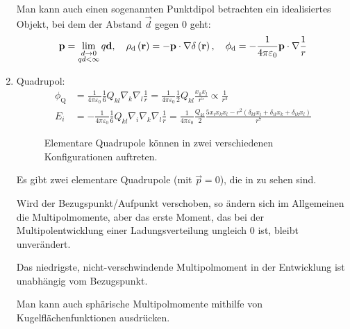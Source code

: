 \begin{enumerate}
	      Man kann auch einen sogenannten Punktdipol betrachten \textendash{} ein idealisiertes Objekt, bei dem der Abstand $\vec {d}$ gegen $0$ geht:
	      \begin{equation*}
		      \mathbf{p}=\lim _{\substack{
				      d\rightarrow 0 \\
				      qd<\infty}} q\mathbf{d},\quad \rho _{\mathop{}\!\mathrm{d} }\left(\mathbf{r}\right)=-\mathbf{p}\cdot \nabla \delta \left(\mathbf{r}\right), \quad\phi _{\mathop{}\!\mathrm{d} }=-\frac{1}{4\pi \varepsilon _{0}}\mathbf{p}\cdot \nabla \frac{1}{r}
	      \end{equation*}
	\item Quadrupol:
	      \begin{align*}
		      \phi _{\mathrm{Q}} & =\frac{1}{4\pi \varepsilon _{0}}\frac{1}{6}Q_{kl}\nabla _{k}\nabla _{l}\frac{1}{r}=\frac{1}{4\pi \varepsilon _{0}}\frac{1}{2}Q_{kl}\frac{x_{k}x_{l}}{r^{5}}\propto \frac{1}{r^{3}}                                                                   \\
		      E_{i}              & =-\frac{1}{4\pi \varepsilon _{0}}\frac{1}{6}Q_{kl}\nabla _{i}\nabla _{k}\nabla _{l}\frac{1}{r}=\frac{1}{4\pi \varepsilon _{0}}\frac{Q_{kl}}{2}\frac{5x_{i}x_{k}x_{l}-r^{2}\left(\delta _{kl}x_{i}+\delta _{il}x_{k}+\delta _{ik}x_{l}\right)}{r^{7}}
	      \end{align*}


	      \begin{figure}[htb]
		      \centering
		      \tfigElementalQuadrupoles
		      \caption{Elementare Quadrupole können in zwei verschiedenen Konfigurationen auftreten. }
		      \label{fig:elemental_quadrupoles}
	      \end{figure}

	      Es gibt zwei elementare Quadrupole (mit $\vec {p}=0$), die in  zu sehen sind.

	      Wird der Bezugspunkt/Aufpunkt verschoben, so ändern sich im Allgemeinen die Multipolmomente, aber das erste Moment, das bei der Multipolentwicklung einer Ladungsverteilung ungleich $0$ ist, bleibt unverändert.


	      \begin{formal}
		      Das niedrigste, nicht-verschwindende Multipolmoment in der Entwicklung ist unabhängig vom Bezugspunkt.
	      \end{formal}
	      Man kann auch sphärische Multipolmomente mithilfe von Kugelflächenfunktionen ausdrücken.
\end{enumerate}



